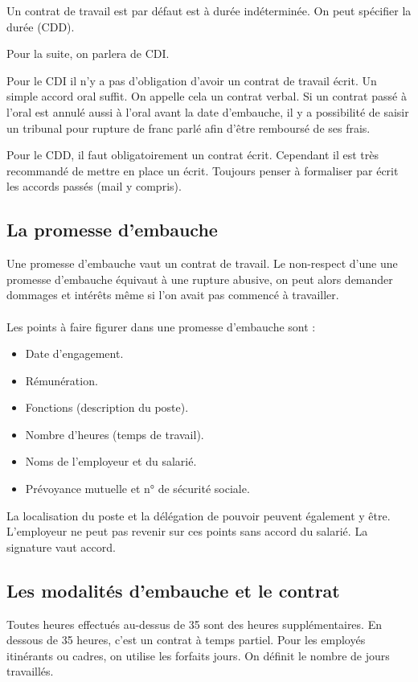 Un contrat de travail est par défaut est à durée indéterminée.
On peut spécifier la durée (CDD).

Pour la suite, on parlera de CDI.

Pour le CDI il n’y a pas d’obligation d’avoir un contrat de travail écrit.
Un simple accord oral suffit.
On appelle cela un contrat verbal.
Si un contrat passé à l'oral est annulé aussi à l'oral avant la date d'embauche, il y a possibilité de saisir un tribunal pour rupture de franc parlé afin d'être remboursé de ses frais.

Pour le CDD, il faut obligatoirement un contrat écrit.
Cependant il est très recommandé de mettre en place un écrit.
Toujours penser à formaliser par écrit les accords passés (mail y compris).


\subsection{La promesse d'embauche}
	Une promesse d’embauche vaut un contrat de travail.
	Le non-respect d’une une promesse d’embauche équivaut à une rupture abusive, on peut alors demander dommages et intérêts même si l'on avait pas commencé à travailler.

	\paragraph{}
	Les points à faire figurer dans une promesse d’embauche sont :
	\begin{itemize}
		\item[\textbullet] Date d’engagement.
		\item[\textbullet] Rémunération.
		\item[\textbullet] Fonctions (description du poste).
		\item[\textbullet] Nombre d’heures (temps de travail).
		\item[\textbullet] Noms de l'employeur et du salarié.
		\item[\textbullet] Prévoyance mutuelle et n° de sécurité sociale.
	\end{itemize}
	
	La localisation du poste et la délégation de pouvoir peuvent également y être.
	L'employeur ne peut pas revenir sur ces points sans accord du salarié.
	La signature vaut accord.

\subsection{Les modalités d'embauche et le contrat}
	Toutes heures effectués au-dessus de 35 sont des heures supplémentaires.
	En dessous de 35 heures, c’est un contrat à temps partiel.
	Pour les employés itinérants ou cadres, on utilise les forfaits jours.
	On définit le nombre de jours travaillés.

